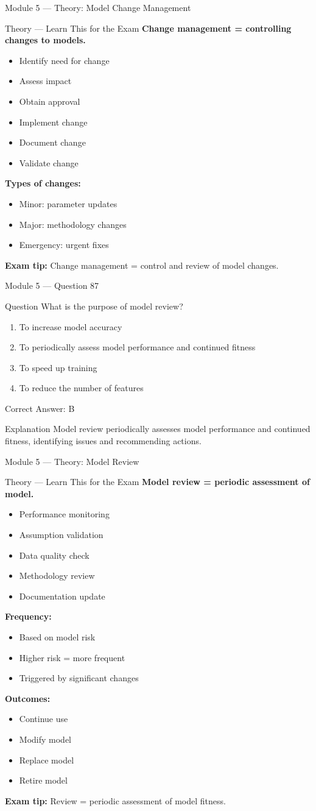 \documentclass[aspectratio=169,10pt]{beamer}
\newcommand{\question}[1]{%
	\begin{block}{Question}
		#1
	\end{block}
}
\newcommand{\options}[4]{%
	\begin{enumerate}[label=\Alph*.,leftmargin=*]
		\item #1
		\item #2
		\item #3
		\item #4
	\end{enumerate}
}
\newcommand{\answerbox}[1]{%
	\begin{exampleblock}{Correct Answer: #1}
	\end{exampleblock}
}
\newcommand{\explain}[1]{%
	\begin{block}{Explanation}
		\small #1
	\end{block}
}
\newcommand{\theory}[1]{%
	\begin{block}{Theory --- Learn This for the Exam}
		\small #1
	\end{block}
}
\begin{document}
	\begin{frame}{Module 5 --- Theory: Model Change Management}
		\theory{
			\textbf{Change management = controlling changes to models.}
			\begin{itemize}
				\item Identify need for change
				\item Assess impact
				\item Obtain approval
				\item Implement change
				\item Document change
				\item Validate change
			\end{itemize}
			\textbf{Types of changes:}
			\begin{itemize}
				\item Minor: parameter updates
				\item Major: methodology changes
				\item Emergency: urgent fixes
			\end{itemize}
			\textbf{Exam tip:} Change management = control and review of model changes.
		}
	\end{frame}
	
	\begin{frame}{Module 5 --- Question 87}
		\question{What is the purpose of model review?}
		\options{To increase model accuracy}{To periodically assess model performance and continued fitness}{To speed up training}{To reduce the number of features}
		\answerbox{B}
		\explain{Model review periodically assesses model performance and continued fitness, identifying issues and recommending actions.}
	\end{frame}
	
	\begin{frame}{Module 5 --- Theory: Model Review}
		\theory{
			\textbf{Model review = periodic assessment of model.}
			\begin{itemize}
				\item Performance monitoring
				\item Assumption validation
				\item Data quality check
				\item Methodology review
				\item Documentation update
			\end{itemize}
			\textbf{Frequency:}
			\begin{itemize}
				\item Based on model risk
				\item Higher risk = more frequent
				\item Triggered by significant changes
			\end{itemize}
			\textbf{Outcomes:}
			\begin{itemize}
				\item Continue use
				\item Modify model
				\item Replace model
				\item Retire model
			\end{itemize}
			\textbf{Exam tip:} Review = periodic assessment of model fitness.
		}
	\end{frame}
	
\end{document}
